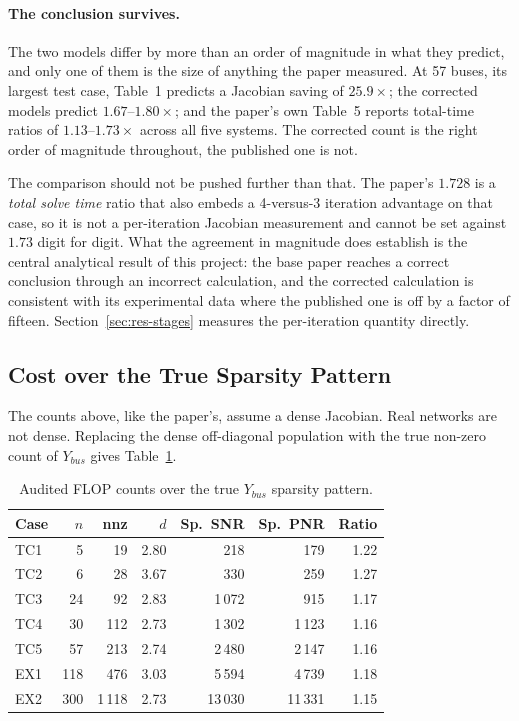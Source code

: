 \documentclass[sigconf,nonacm]{acmart}
\begin{document}
\paragraph{The conclusion survives.}
The two models differ by more than an order of magnitude in what they predict,
and only one of them is the size of anything the paper measured. At 57 buses,
its largest test case, Table~1 predicts a Jacobian saving of
$\mathbf{25.9\times}$; the corrected models predict $1.67$--$1.80\times$; and the
paper's own Table~5 reports total-time ratios of $1.13$--$1.73\times$ across all
five systems. The corrected count is the right order of magnitude throughout,
the published one is not.

The comparison should not be pushed further than that. The paper's $1.728$ is a
\emph{total solve time} ratio that also embeds a 4-versus-3 iteration advantage
on that case, so it is not a per-iteration Jacobian measurement and cannot be set
against $1.73$ digit for digit. What the agreement in magnitude does establish is
the central analytical result of this project: the base paper reaches a correct
conclusion through an incorrect calculation, and the corrected calculation is
consistent with its experimental data where the published one is off by a factor
of fifteen. Section~\ref{sec:res-stages} measures the per-iteration quantity
directly.

\subsection{Cost over the True Sparsity Pattern}
\label{sec:res-sparse}
The counts above, like the paper's, assume a dense Jacobian. Real networks are
not dense. Replacing the dense off-diagonal population with the true non-zero
count of $Y_{bus}$ gives Table~\ref{tab:sparse-flops}.

\begin{table}[t]
\centering
\caption{Audited FLOP counts over the true $Y_{bus}$ sparsity pattern.}
\label{tab:sparse-flops}
\small
\begin{tabular}{l r r r r r r}
\toprule
Case & $n$ & nnz & $d$ & Sp.\ SNR & Sp.\ PNR & Ratio \\
\midrule
TC1 & 5   & 19     & 2.80 & 218     & 179     & 1.22 \\
TC2 & 6   & 28     & 3.67 & 330     & 259     & 1.27 \\
TC3 & 24  & 92     & 2.83 & 1\,072  & 915     & 1.17 \\
TC4 & 30  & 112    & 2.73 & 1\,302  & 1\,123  & 1.16 \\
TC5 & 57  & 213    & 2.74 & 2\,480  & 2\,147  & 1.16 \\
EX1 & 118 & 476    & 3.03 & 5\,594  & 4\,739  & 1.18 \\
EX2 & 300 & 1\,118 & 2.73 & 13\,030 & 11\,331 & 1.15 \\
\bottomrule
\end{tabular}
\end{table}
\end{document}
